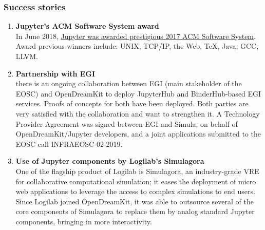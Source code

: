 \subsubsection{Success stories}
\begin{enumerate}
\item \textbf{Jupyter's ACM Software System award}\\
  In June 2018,
  \href{https://blog.jupyter.org/jupyter-receives-the-acm-software-system-award-d433b0dfe3a2}{Jupyter
    was awarded prestigious 2017 ACM Software System}. Award previous
  winners include: UNIX, TCP/IP, the Web, TeX, Java, GCC, LLVM.

\item \textbf{Partnership with EGI}\\
  there is an ongoing collaboration between EGI (main stakeholder of
  the EOSC) and OpenDreamKit to deploy JupyterHub and BinderHub-based
  EGI services. Proofs of concepts for both have been
  deployed.%
  Both parties are very satisfied with the collaboration and want to
  strengthen it. A Technology Provider Agreement was signed between
  EGI and Simula, on behalf of OpenDreamKit/Jupyter developers, and a
  joint applications submitted to the EOSC call INFRAEOSC-02-2019.

\item \textbf{Use of Jupyter components by Logilab's Simulagora}\\
  One of the flagship product of Logilab is Simulagora, an
  industry-grade VRE for collaborative computational simulation; it
  eases the deployment of micro web applications to leverage the
  access to complex simulations to end users. Since Logilab joined
  OpenDreamKit, it was able to outsource several of the core
  components of Simulagora to replace them by analog standard Jupyter
  components, bringing in more interactivity.



\end{enumerate}
